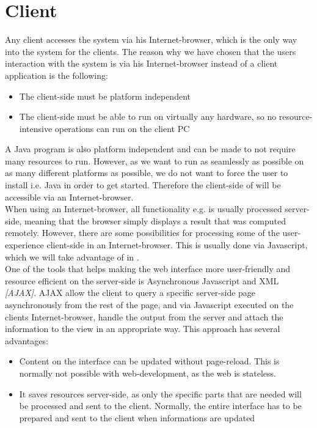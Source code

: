 
\section{Client}
Any client accesses the system via his Internet-browser, which is the only way into the system for the clients. 
The reason why we have chosen that the users interaction with the system is via his Internet-browser instead of a client application is the following:

\begin{itemize}
	\item The client-side must be platform independent
	\item The client-side must be able to run on virtually any hardware, so no resource-intensive operations can run on the client PC
\end{itemize}

A Java program is also platform independent and can be made to not require many resources to run. 
However, as we want \projectname{} to run as seamlessly as possible on as many different platforms as possible, we do not want to force the user to install i.e. Java in order to get started.
Therefore the client-side of \projectname{} will be accessible via an Internet-browser. \\

When using an Internet-browser, all functionality e.g. is usually processed server-side, meaning that the browser simply displays a result that was computed remotely. 
However, there are some possibilities for processing some of the user-experience client-side in an Internet-browser. 
This is usually done via Javascript, which we will take advantage of in \projectname{}. \\

One of the tools that helps making the web interface more user-friendly and resource efficient on the server-side is Asynchronous Javascript and XML \emph{[AJAX]}. 
AJAX allow the client to query a specific server-side page asynchronously from the rest of the page, and via Javascript executed on the clients Internet-browser, handle the output from the server and attach the information to the view in an appropriate way. 
This approach has several advantages:

\begin{itemize}
	\item Content on the interface can be updated without page-reload. This is normally not possible with web-development, as the web is stateless.
	\item It saves resources server-side, as only the specific parts that are needed will be processed and sent to the client. Normally, the entire interface has to be prepared and sent to the client when informations are updated
\end{itemize}

